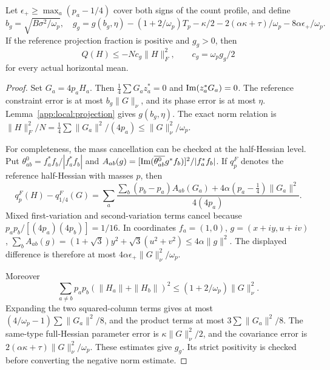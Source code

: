 \begin{lemma}\label{app:local:mass-mean}
Let $\epsilon_+\ge\max_a(p_a-1/4)$ cover both signs of the count profile,
and define
\[
 b_g=\sqrt{B\sigma^2/\omega_p},\quad
 g_g=g(b_g,\eta)-(1+2/\omega_p)T_p-\kappa/2
                   -2(\alpha\kappa+\tau)/\omega_p-8\alpha\epsilon_+/\omega_p .
\]
If the reference projection fraction is positive and $g_g>0$, then
\begin{equation}\label{app:local:mass-gap}
 Q(H)\le-Nc_g\|H\|_F^2,\qquad c_g=\omega_p g_g/2
\end{equation}
for every actual horizontal mean.
\end{lemma}
\begin{proof}
Set $G_a=4p_aH_a$. Then $\frac14\sum G_az_a^*=0$ and
$\operatorname{Im}(z_a^*G_a)=0$. The reference constraint error is at most
$b_g\|G\|_\nu$, and its phase error is at most $\eta$.
Lemma~\ref{app:local:projection} gives $g(b_g,\eta)$.
The exact norm relation is
$\|H\|_F^2/N=\frac14\sum\|G_a\|^2/(4p_a)\le\|G\|_\nu^2/\omega_p$.

For completeness, the mass cancellation can be checked at the
half-Hessian level. Put
$\theta^0_{ab}=f_a^*f_b/|f_a^*f_b|$ and
$A_{ab}(g)=[\operatorname{Im}(\overline{\theta^0_{ab}}g^*f_b)]^2/|f_a^*f_b|$.
If $q_p^F$ denotes the reference half-Hessian with masses $p$, then
\[
 q_p^F(H)-q_{1/4}^F(G)
 =\sum_a\frac{\sum_b(p_b-p_a)A_{ab}(G_a)
                         +4\alpha(p_a-\tfrac14)\|G_a\|^2}{4(4p_a)} .
\]
Mixed first-variation and second-variation terms cancel because
$p_ap_b/[(4p_a)(4p_b)]=1/16$.
In coordinates $f_a=(1,0)$, $g=(x+iy,u+iv)$,
$\sum_bA_{ab}(g)=(1+\sqrt3)y^2+\sqrt3(u^2+v^2)
\le4\alpha\|g\|^2$.
The displayed difference is therefore at most
$4\alpha\epsilon_+\|G\|_\nu^2/\omega_p$.

Moreover
\[
 \sum_{a\ne b}p_ap_b(\|H_a\|+\|H_b\|)^2
                       \le(1+2/\omega_p)\|G\|_\nu^2 .
\]
Expanding the two squared-column terms gives at most
$(4/\omega_p-1)\sum\|G_a\|^2/8$, and the product terms at most
$3\sum\|G_a\|^2/8$.
The same-type full-Hessian parameter error is $\kappa\|G\|_\nu^2/2$,
and the covariance error is $2(\alpha\kappa+\tau)\|G\|_\nu^2/\omega_p$.
These estimates give $g_g$. Its strict positivity is checked before
converting the negative norm estimate.
\end{proof}

